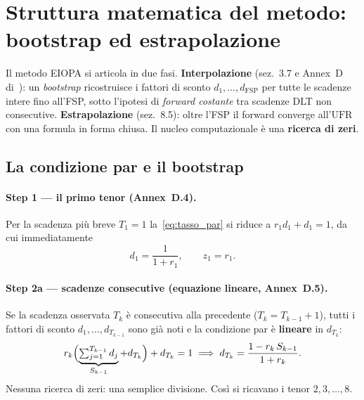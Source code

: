 \documentclass[11pt,a4paper]{article}
\theoremstyle{plain}
\theoremstyle{definition}
\theoremstyle{remark}
\newcommand{\UFR}{\mathrm{UFR}}
\newcommand{\FSP}{\mathrm{FSP}}
\begin{document}
\section{Struttura matematica del metodo: bootstrap ed estrapolazione}
\label{sec:metodo}

Il metodo EIOPA si articola in due fasi. \textbf{Interpolazione} (sez.~3.7 e Annex~D
di~\cite{eiopa2026}): un \emph{bootstrap} ricostruisce i fattori di sconto
$d_1,\ldots,d_{\FSP}$ per tutte le scadenze intere fino all'FSP, sotto l'ipotesi di
\emph{forward costante} tra scadenze DLT non consecutive. \textbf{Estrapolazione} (sez.~8.5):
oltre l'FSP il forward converge all'$\UFR$ con una formula in forma chiusa. Il nucleo
computazionale \`e una \textbf{ricerca di zeri}.

\subsection{La condizione par e il bootstrap}
\label{sec:bootstrap}

\paragraph{Step 1 --- il primo tenor (Annex~D.4).}
Per la scadenza pi\`u breve $T_1=1$ la~\eqref{eq:tasso_par} si riduce a $r_1 d_1+d_1=1$, da
cui immediatamente
\begin{equation}
  \label{eq:step1}
  d_1 = \frac{1}{1+r_1}, \qquad z_1 = r_1.
\end{equation}

\paragraph{Step 2a --- scadenze consecutive (equazione lineare, Annex~D.5).}
Se la scadenza osservata $T_{k}$ \`e consecutiva alla precedente ($T_{k}=T_{k-1}+1$), tutti i
fattori di sconto $d_1,\dots,d_{T_{k-1}}$ sono gi\`a noti e la condizione par \`e
\textbf{lineare} in $d_{T_k}$:
\begin{equation}
  \label{eq:step2-lin}
  r_{k}\Bigl(\underbrace{\textstyle\sum_{j=1}^{T_{k-1}} d_j}_{S_{k-1}} + d_{T_k}\Bigr)
  + d_{T_k} = 1
  \;\Longrightarrow\;
  d_{T_k} = \frac{1 - r_{k}\,S_{k-1}}{1 + r_{k}}.
\end{equation}
Nessuna ricerca di zeri: una semplice divisione. Cos\`i si ricavano i tenor $2,3,\dots,8$.
\end{document}

